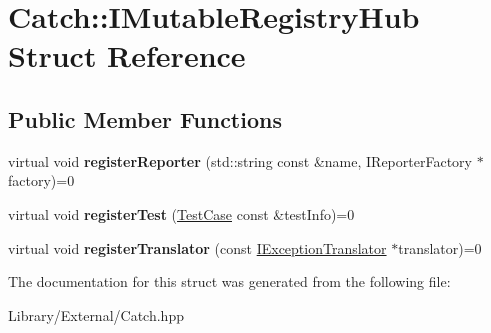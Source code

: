 \hypertarget{struct_catch_1_1_i_mutable_registry_hub}{}\section{Catch\+:\+:I\+Mutable\+Registry\+Hub Struct Reference}
\label{struct_catch_1_1_i_mutable_registry_hub}
\subsection*{Public Member Functions}
\begin{DoxyCompactItemize}
\item 
\hypertarget{struct_catch_1_1_i_mutable_registry_hub_a1f61ed2b3f2d160b31a0f2c1d9a52af1}{}virtual void {\bfseries register\+Reporter} (std\+::string const \&name, I\+Reporter\+Factory $\ast$factory)=0\label{struct_catch_1_1_i_mutable_registry_hub_a1f61ed2b3f2d160b31a0f2c1d9a52af1}

\item 
\hypertarget{struct_catch_1_1_i_mutable_registry_hub_a11b85c6744d88c9f83fe16ad4a8dd451}{}virtual void {\bfseries register\+Test} (\hyperlink{class_catch_1_1_test_case}{Test\+Case} const \&test\+Info)=0\label{struct_catch_1_1_i_mutable_registry_hub_a11b85c6744d88c9f83fe16ad4a8dd451}

\item 
\hypertarget{struct_catch_1_1_i_mutable_registry_hub_ae6825365102693cf7707db022a2c2b49}{}virtual void {\bfseries register\+Translator} (const \hyperlink{struct_catch_1_1_i_exception_translator}{I\+Exception\+Translator} $\ast$translator)=0\label{struct_catch_1_1_i_mutable_registry_hub_ae6825365102693cf7707db022a2c2b49}

\end{DoxyCompactItemize}


The documentation for this struct was generated from the following file\+:\begin{DoxyCompactItemize}
\item 
Library/\+External/Catch.\+hpp\end{DoxyCompactItemize}
